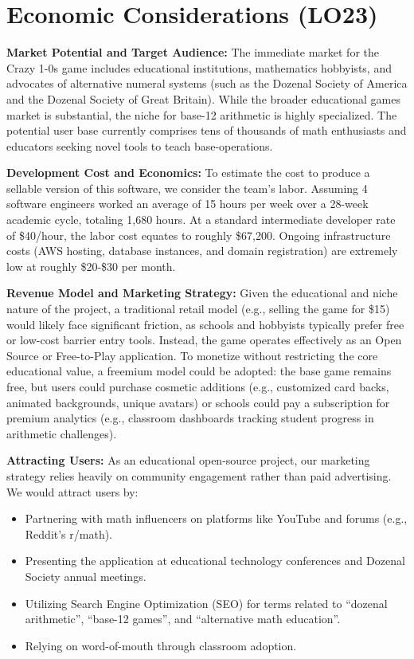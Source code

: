 \documentclass{article}
\begin{document}
\section{Economic Considerations (LO23)}

\textbf{Market Potential and Target Audience:}
The immediate market for the Crazy 1-0s game includes educational institutions, mathematics hobbyists, and advocates of alternative numeral systems (such as the Dozenal Society of America and the Dozenal Society of Great Britain). While the broader educational games market is substantial, the niche for base-12 arithmetic is highly specialized. The potential user base currently comprises tens of thousands of math enthusiasts and educators seeking novel tools to teach base-operations.

\textbf{Development Cost and Economics:}
To estimate the cost to produce a sellable version of this software, we consider the team's labor. Assuming 4 software engineers worked an average of 15 hours per week over a 28-week academic cycle, totaling 1,680 hours. At a standard intermediate developer rate of \$40/hour, the labor cost equates to roughly \$67,200. Ongoing infrastructure costs (AWS hosting, database instances, and domain registration) are extremely low at roughly \$20-\$30 per month. 

\textbf{Revenue Model and Marketing Strategy:}
Given the educational and niche nature of the project, a traditional retail model (e.g., selling the game for \$15) would likely face significant friction, as schools and hobbyists typically prefer free or low-cost barrier entry tools. Instead, the game operates effectively as an Open Source or Free-to-Play application. 
To monetize without restricting the core educational value, a freemium model could be adopted: the base game remains free, but users could purchase cosmetic additions (e.g., customized card backs, animated backgrounds, unique avatars) or schools could pay a subscription for premium analytics (e.g., classroom dashboards tracking student progress in arithmetic challenges).

\textbf{Attracting Users:}
As an educational open-source project, our marketing strategy relies heavily on community engagement rather than paid advertising. We would attract users by:
\begin{itemize}
    \item Partnering with math influencers on platforms like YouTube and forums (e.g., Reddit's r/math).
    \item Presenting the application at educational technology conferences and Dozenal Society annual meetings.
    \item Utilizing Search Engine Optimization (SEO) for terms related to ``dozenal arithmetic'', ``base-12 games'', and ``alternative math education''.
    \item Relying on word-of-mouth through classroom adoption.
\end{itemize}
\end{document}
